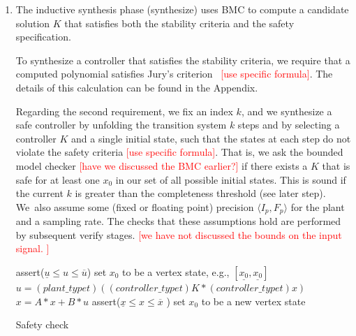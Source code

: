 \documentclass[twocolumn]{autart}    %
\renewcommand{\note}[1]{\textcolor{red}{[#1]}}
\begin{document}
\begin{enumerate}

\item The inductive synthesis phase ({\sc synthesize}) uses BMC to compute a
candidate solution $K$ that satisfies both the stability criteria and the
safety specification.  

To synthesize a controller that satisfies the
stability criteria, we require that a computed polynomial satisfies Jury's
criterion~\cite{fadali} \note{use specific formula}.  The details of this calculation can be found in
the Appendix.

Regarding the second requirement, 
we fix an index $k$, 
and we synthesize a safe controller by
unfolding the transition system $k$ steps and by selecting a controller $K$ and a single initial state, 
such that the states at each step do not violate the safety criteria \note{use specific formula}.  
That is, we ask the bounded model checker \note{have we discussed the BMC earlier?} if there exists a $K$ that is safe for at least one $x_0$ in our set of all possible initial states.  
This is sound if the current $k$ is greater than the completeness threshold (see later step).  
We~also assume some (fixed or floating point) precision $\langle I_p,F_p\rangle$ for the plant and a sampling rate.  
The checks that these assumptions hold are performed by subsequent {\sc verify} stages. 
\note{we have not discussed the bounds on the input signal. }



\begin{algorithm}[]
\begin{algorithmic}[1]
\State assert($ \underline{u}  \leq u \leq \overline{u}$)
 \State set $x_0$ to be a vertex state, e.g., $[\underline{x_0},\underline{x_0}]$	
		\State $u = (plant\_typet)((controller\_typet)K * (controller\_typet) x)$
		\State $x = A * x + B * u$
		\State assert($\underline{x} \leq x \leq \overline{x}$ )
  	\EndFor
  	\State set $x_0$ to be a new vertex state
  	\EndFor
\EndFunction
\end{algorithmic}
\caption{Safety check\label{alg:safetycheck}}
\end{algorithm}


\end{enumerate}
\end{document}
